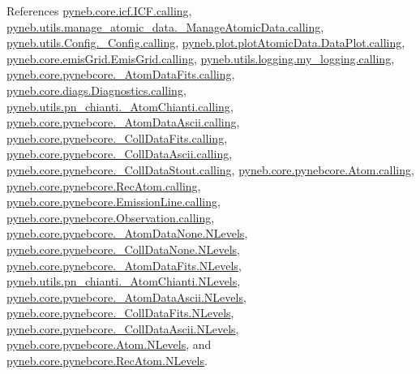 References \hyperlink{icf_8py_source_l00016}{pyneb.\-core.\-icf.\-I\-C\-F.\-calling}, \hyperlink{manage__atomic__data_8py_source_l00018}{pyneb.\-utils.\-manage\-\_\-atomic\-\_\-data.\-\_\-\-Manage\-Atomic\-Data.\-calling}, \hyperlink{_config_8py_source_l00032}{pyneb.\-utils.\-Config.\-\_\-\-Config.\-calling}, \hyperlink{plot_atomic_data_8py_source_l00042}{pyneb.\-plot.\-plot\-Atomic\-Data.\-Data\-Plot.\-calling}, \hyperlink{emis_grid_8py_source_l00044}{pyneb.\-core.\-emis\-Grid.\-Emis\-Grid.\-calling}, \hyperlink{logging_8py_source_l00044}{pyneb.\-utils.\-logging.\-my\-\_\-logging.\-calling}, \hyperlink{pynebcore_8py_source_l00097}{pyneb.\-core.\-pynebcore.\-\_\-\-Atom\-Data\-Fits.\-calling}, \hyperlink{diags_8py_source_l00169}{pyneb.\-core.\-diags.\-Diagnostics.\-calling}, \hyperlink{pn__chianti_8py_source_l00240}{pyneb.\-utils.\-pn\-\_\-chianti.\-\_\-\-Atom\-Chianti.\-calling}, \hyperlink{pynebcore_8py_source_l00318}{pyneb.\-core.\-pynebcore.\-\_\-\-Atom\-Data\-Ascii.\-calling}, \hyperlink{pynebcore_8py_source_l00585}{pyneb.\-core.\-pynebcore.\-\_\-\-Coll\-Data\-Fits.\-calling}, \hyperlink{pynebcore_8py_source_l00936}{pyneb.\-core.\-pynebcore.\-\_\-\-Coll\-Data\-Ascii.\-calling}, \hyperlink{pynebcore_8py_source_l01156}{pyneb.\-core.\-pynebcore.\-\_\-\-Coll\-Data\-Stout.\-calling}, \hyperlink{pynebcore_8py_source_l01229}{pyneb.\-core.\-pynebcore.\-Atom.\-calling}, \hyperlink{pynebcore_8py_source_l02643}{pyneb.\-core.\-pynebcore.\-Rec\-Atom.\-calling}, \hyperlink{pynebcore_8py_source_l03385}{pyneb.\-core.\-pynebcore.\-Emission\-Line.\-calling}, \hyperlink{pynebcore_8py_source_l03541}{pyneb.\-core.\-pynebcore.\-Observation.\-calling}, \hyperlink{pynebcore_8py_source_l00069}{pyneb.\-core.\-pynebcore.\-\_\-\-Atom\-Data\-None.\-N\-Levels}, \hyperlink{pynebcore_8py_source_l00082}{pyneb.\-core.\-pynebcore.\-\_\-\-Coll\-Data\-None.\-N\-Levels}, \hyperlink{pynebcore_8py_source_l00098}{pyneb.\-core.\-pynebcore.\-\_\-\-Atom\-Data\-Fits.\-N\-Levels}, \hyperlink{pn__chianti_8py_source_l00242}{pyneb.\-utils.\-pn\-\_\-chianti.\-\_\-\-Atom\-Chianti.\-N\-Levels}, \hyperlink{pynebcore_8py_source_l00319}{pyneb.\-core.\-pynebcore.\-\_\-\-Atom\-Data\-Ascii.\-N\-Levels}, \hyperlink{pynebcore_8py_source_l00586}{pyneb.\-core.\-pynebcore.\-\_\-\-Coll\-Data\-Fits.\-N\-Levels}, \hyperlink{pynebcore_8py_source_l00933}{pyneb.\-core.\-pynebcore.\-\_\-\-Coll\-Data\-Ascii.\-N\-Levels}, \hyperlink{pynebcore_8py_source_l01231}{pyneb.\-core.\-pynebcore.\-Atom.\-N\-Levels}, and \hyperlink{pynebcore_8py_source_l02661}{pyneb.\-core.\-pynebcore.\-Rec\-Atom.\-N\-Levels}.



